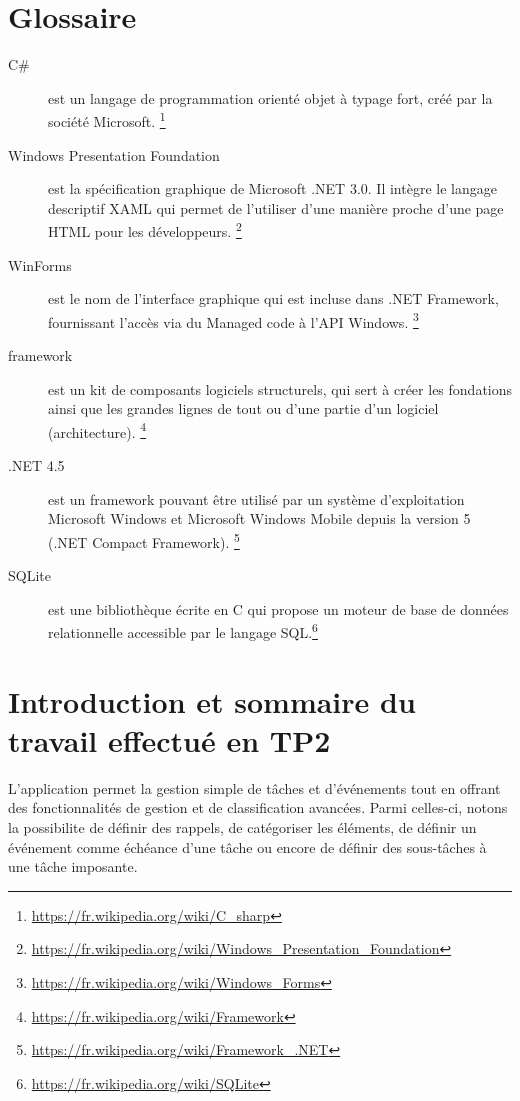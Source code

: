 \documentclass[letterpaper, oneside, 12pt, these, creativecommons]{thETS}
\begin{document}


\tableofcontents
\listoftables
\listoffigures

\chapter{Glossaire}

\begin{description}
\item[C\#] est un langage de programmation orienté objet à typage fort, créé par la société Microsoft. \footnote{\url{https://fr.wikipedia.org/wiki/C_sharp}}
\item[Windows Presentation Foundation] est la spécification graphique de Microsoft .NET 3.0. Il intègre le langage descriptif XAML qui permet de l'utiliser d'une manière proche d'une page HTML pour les développeurs. \footnote{\url{https://fr.wikipedia.org/wiki/Windows_Presentation_Foundation}}
\item[WinForms] est le nom de l'interface graphique qui est incluse dans .NET Framework, fournissant l'accès via du Managed code à l'API Windows. \footnote{\url{https://fr.wikipedia.org/wiki/Windows_Forms}}
\item[framework] est un kit de composants logiciels structurels, qui sert à créer les fondations ainsi que les grandes lignes de tout ou d’une partie d'un logiciel (architecture). \footnote{\url{https://fr.wikipedia.org/wiki/Framework}}
\item[.NET 4.5] est un framework pouvant être utilisé par un système d'exploitation Microsoft Windows et Microsoft Windows Mobile depuis la version 5 (.NET Compact Framework). \footnote{\url{https://fr.wikipedia.org/wiki/Framework_.NET}}
\item[SQLite] est une bibliothèque écrite en C qui propose un moteur de base de données relationnelle accessible par le langage SQL.\footnote{\url{https://fr.wikipedia.org/wiki/SQLite}}
\end{description}

\chapter{Introduction et sommaire du travail effectué en TP2}

L'application permet la gestion simple de tâches et d'événements tout en offrant des fonctionnalités de gestion et de classification avancées. Parmi celles-ci, notons la possibilite de définir des rappels, de catégoriser les éléments, de définir un événement comme échéance d'une tâche ou encore de définir des sous-tâches à une tâche imposante.
\end{document}
